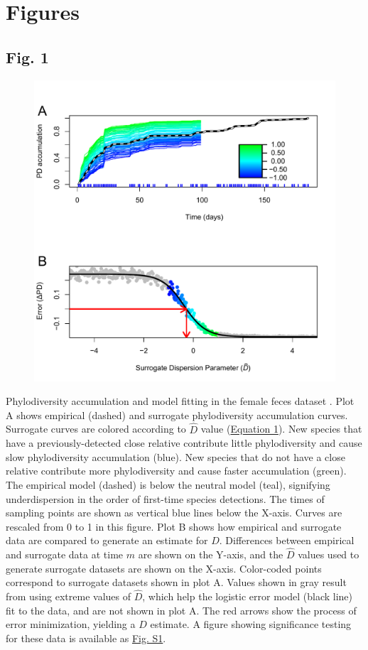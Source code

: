 \documentclass{article}
\begin{document}
\section{Figures}
{\parindent0pt %
\subsection{Fig. 1}\label{sec:figure1}
\begin{figure}[ht]
	\centering
	\includegraphics[scale=0.80]{figs/Fig_1.pdf}
\end{figure}
Phylodiversity accumulation and model fitting in the female feces dataset \cite{Caporaso2011}. Plot A shows empirical (dashed) and surrogate phylodiversity accumulation curves. Surrogate curves are colored according to \(\hat{D}\) value (\hyperref[sec:equation1]{Equation 1}). New species that have a previously-detected close relative contribute little phylodiversity and cause slow phylodiversity accumulation (blue). New species that do not have a close relative contribute more phylodiversity and cause faster accumulation (green). The empirical model (dashed) is below the neutral model (teal), signifying underdispersion in the order of first-time species detections. The times of sampling points are shown as vertical blue lines below the X-axis. Curves are rescaled from 0 to 1 in this figure. Plot B shows how empirical and surrogate data are compared to generate an estimate for \(D\). Differences between empirical and surrogate data at time \(m\) are shown on the Y-axis, and the \(\hat{D}\) values used to generate surrogate datasets are shown on the X-axis. Color-coded points correspond to surrogate datasets shown in plot A. Values shown in gray result from using extreme values of \(\hat{D}\), which help the logistic error model (black line) fit to the data, and are not shown in plot A. The red arrows show the process of error minimization, yielding a \(D\) estimate. A figure showing significance testing for these data is available as \hyperref[sec:figureS1]{Fig. S1}.
\newpage

}
\end{document}
